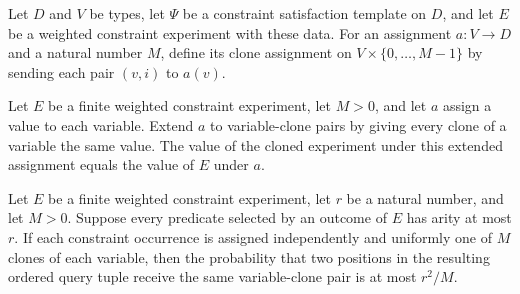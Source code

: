 \begin{definition}
\label{FABL.WeightedConstraintExperiment.constantCloneAssignment}
\leanok
Let $D$ and $V$ be types, let $\Psi$ be a constraint satisfaction template on $D$, and
let $E$ be a weighted constraint experiment with these data. For an assignment $a:V\to
D$ and a natural number $M$, define its clone assignment on $V\times\{0,\ldots,M-1\}$ by
sending each pair $(v,i)$ to $a(v)$.
\end{definition}

\begin{theorem}
\label{FABL.WeightedConstraintExperiment.clone_value_constantCloneAssignment}
\leanok
{}
Let $E$ be a finite weighted constraint experiment, let $M>0$, and let $a$ assign a
value to each variable. Extend $a$ to variable-clone pairs by giving every clone of a
variable the same value. The value of the cloned experiment under this extended
assignment equals the value of $E$ under $a$.
\end{theorem}

\begin{theorem}
\label{FABL.WeightedConstraintExperiment.cloneCollisionProbability_le}
\leanok
{}
Let $E$ be a finite weighted constraint experiment, let $r$ be a natural number, and let
$M>0$. Suppose every predicate selected by an outcome of $E$ has arity at most $r$. If
each constraint occurrence is assigned independently and uniformly one of $M$ clones of
each variable, then the probability that two positions in the resulting ordered query
tuple receive the same variable-clone pair is at most $r^2/M$.
\end{theorem}

